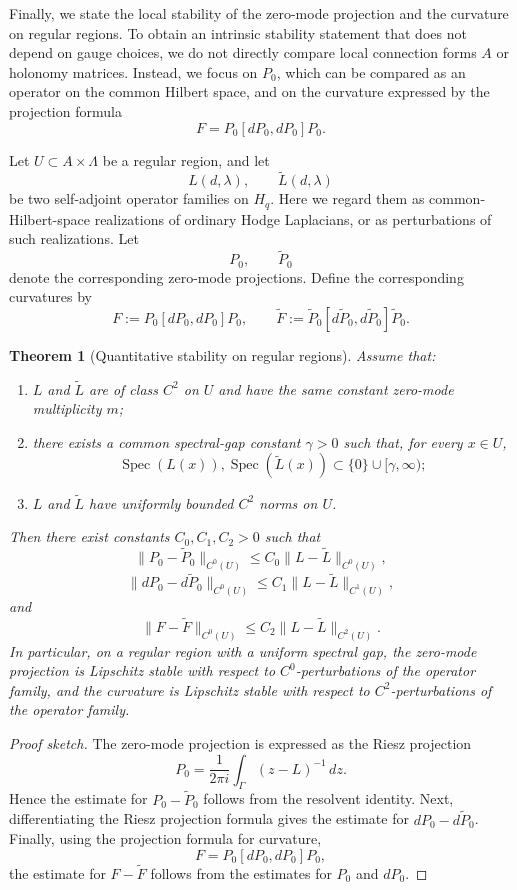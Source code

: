 \documentclass[10pt,a4paper]{amsart}
\newtheorem{theorem}{Theorem}%
\begin{document}
Finally, we state the local stability of the zero-mode projection and the curvature on regular regions. To obtain an intrinsic stability statement that does not depend on gauge choices, we do not directly compare local connection forms \(A\) or holonomy matrices. Instead, we focus on \(P_0\), which can be compared as an operator on the common Hilbert space, and on the curvature expressed by the projection formula
\[
F=P_0[dP_0,dP_0]P_0.
\]

Let \(U\subset A\times\Lambda\) be a regular region, and let
\[
L(d,\lambda),
\qquad
\widetilde L(d,\lambda)
\]
be two self-adjoint operator families on \(H_q\). Here we regard them as common-Hilbert-space realizations of ordinary Hodge Laplacians, or as perturbations of such realizations. Let
\[
P_0,\qquad \widetilde P_0
\]
denote the corresponding zero-mode projections. Define the corresponding curvatures by
\[
F:=P_0[dP_0,dP_0]P_0,
\qquad
\widetilde F:=
\widetilde P_0[d\widetilde P_0,d\widetilde P_0]\widetilde P_0.
\]


\begin{theorem}[Quantitative stability on regular regions]
Assume that:
\begin{enumerate}
\item \(L\) and \(\widetilde L\) are of class \(C^2\) on \(U\) and have the same constant zero-mode multiplicity \(m\);
\item there exists a common spectral-gap constant \(\gamma>0\) such that, for every \(x\in U\),
\[
\operatorname{Spec}(L(x)),
\operatorname{Spec}(\widetilde L(x))
\subset
\{0\}\cup[\gamma,\infty);
\]
\item \(L\) and \(\widetilde L\) have uniformly bounded \(C^2\) norms on \(U\).
\end{enumerate}
Then there exist constants \(C_0,C_1,C_2>0\) such that
\[
\|P_0-\widetilde P_0\|_{C^0(U)}
\le
C_0\|L-\widetilde L\|_{C^0(U)},
\]
\[
\|dP_0-d\widetilde P_0\|_{C^0(U)}
\le
C_1\|L-\widetilde L\|_{C^1(U)},
\]
and
\[
\|F-\widetilde F\|_{C^0(U)}
\le
C_2\|L-\widetilde L\|_{C^2(U)}.
\]
In particular, on a regular region with a uniform spectral gap, the zero-mode projection is Lipschitz stable with respect to \(C^0\)-perturbations of the operator family, and the curvature is Lipschitz stable with respect to \(C^2\)-perturbations of the operator family.
\end{theorem}

\begin{proof}[Proof sketch]
The zero-mode projection is expressed as the Riesz projection
\[
P_0
=
\frac{1}{2\pi i}
\int_\Gamma
(z-L)^{-1}\,dz.
\]
Hence the estimate for \(P_0-\widetilde P_0\) follows from the resolvent identity. Next, differentiating the Riesz projection formula gives the estimate for \(dP_0-d\widetilde P_0\). Finally, using the projection formula for curvature,
\[
F=P_0[dP_0,dP_0]P_0,
\]
the estimate for \(F-\widetilde F\) follows from the estimates for \(P_0\) and \(dP_0\).
\end{proof}
\end{document}
